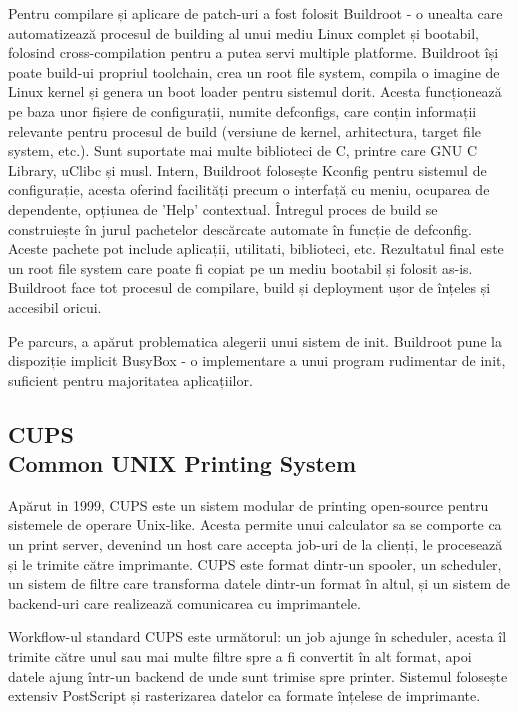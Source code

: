 \documentclass[12pt]{report}
\begin{document}
Pentru compilare și aplicare de patch-uri a fost folosit Buildroot - o unealta care automatizează procesul de building al unui mediu Linux complet și bootabil, folosind cross-compilation pentru a putea servi multiple platforme. Buildroot își poate build-ui propriul toolchain, crea un root file system, compila o imagine de Linux kernel și genera un boot loader pentru sistemul dorit. Acesta funcționează pe baza unor fișiere de configurații, numite defconfigs, care conțin informații relevante pentru procesul de build (versiune de kernel, arhitectura, target file system, etc.). Sunt suportate mai multe biblioteci de C, printre care GNU C Library, uClibc și musl. Intern, Buildroot folosește Kconfig pentru sistemul de configurație, acesta oferind facilități precum o interfață cu meniu, ocuparea de dependente, opțiunea de 'Help' contextual. Întregul proces de build se construiește în jurul pachetelor descărcate automate în funcție de defconfig. Aceste pachete pot include aplicații, utilitati, biblioteci, etc. Rezultatul final este un root file system care poate fi copiat pe un mediu bootabil și folosit as-is. Buildroot face tot procesul de compilare, build și deployment ușor de înțeles și accesibil oricui.

Pe parcurs, a apărut problematica alegerii unui sistem de init. Buildroot pune la dispoziție implicit BusyBox - o implementare a unui program rudimentar de init, suficient pentru majoritatea aplicațiilor.
		\subsection[CUPS]{CUPS\\ {\normalsize Common UNIX Printing System}}
Apărut in 1999, CUPS este un sistem modular de printing open-source pentru sistemele de operare Unix-like. Acesta permite unui calculator sa se comporte ca un print server, devenind un host care accepta job-uri de la clienți, le procesează și le trimite către imprimante.
CUPS este format dintr-un spooler, un scheduler, un sistem de filtre care transforma datele dintr-un format în altul, și un sistem de backend-uri care realizează comunicarea cu imprimantele.

Workflow-ul standard CUPS este următorul: un job ajunge în scheduler, acesta îl trimite către unul sau mai multe filtre spre a fi convertit în alt format, apoi datele ajung într-un backend de unde sunt trimise spre printer. Sistemul folosește extensiv PostScript și rasterizarea datelor ca formate înțelese de imprimante.
\end{document}
